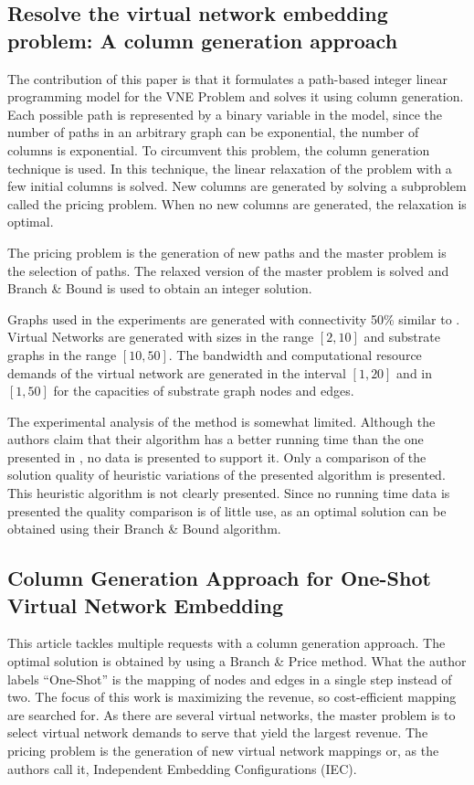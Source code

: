\subsection{Resolve the virtual network embedding problem: A column generation approach \cite{hu:2013}}
The contribution of this paper is that it formulates a path-based integer linear programming model for the VNE Problem and solves it using column generation. Each possible path is represented by a binary variable in the model, since the number of paths in an arbitrary graph can be exponential, the number of columns is exponential. To circumvent this problem, the column generation technique is used. In this technique, the linear relaxation of the problem with a few initial columns is solved. New columns are generated by solving a subproblem called the pricing problem. When no new columns are generated, the relaxation is optimal.\

The pricing problem is the generation of new paths and the master problem is the selection of paths. The relaxed version of the master problem is solved and Branch \& Bound is used to obtain an integer solution.

Graphs used in the experiments are generated with connectivity 50\% similar to \cite{Chowdhury:2012}. Virtual Networks are generated with sizes in the range $[2,10]$ and substrate graphs in the range $[10,50]$. The bandwidth and computational resource demands of the virtual network are generated in the interval $[1,20]$ and in $[1,50]$ for the capacities of substrate graph nodes and edges.

The experimental analysis of the method is somewhat limited. Although the authors claim that their algorithm has a better running time than the one presented in \cite{Chowdhury2009}, no data is presented to support it. Only a comparison of the solution quality of heuristic variations of the presented algorithm is presented. This heuristic algorithm is not clearly presented. Since no running time data is presented the quality comparison is of little use, as an optimal solution can be obtained using their Branch \& Bound algorithm.

\subsection{Column Generation Approach for One-Shot Virtual Network Embedding \cite{Jarray2012}}
This article tackles multiple requests with a column generation approach. The optimal solution is obtained by using a Branch \& Price method. What the author labels ``One-Shot'' is the mapping of nodes and edges in a single step instead of two. The focus of this work is maximizing the revenue, so cost-efficient mapping are searched for. As there are several virtual networks, the master problem is to select virtual network demands to serve that yield the largest revenue. The pricing problem is the generation of new virtual network mappings or, as the authors call it, Independent Embedding Configurations (IEC). 

